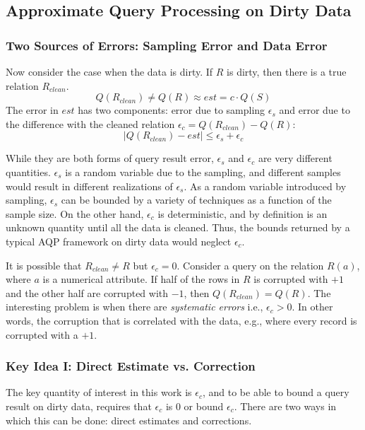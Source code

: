 \subsection{Approximate Query Processing on Dirty Data}


\subsubsection{Two Sources of Errors: Sampling Error and Data Error}
Now consider the case when the data is dirty.
If $R$ is dirty, then there is a true relation $R_{clean}$.
\[
Q(R_{clean}) \ne Q(R) \approx est = c \cdot Q(S)
\]
The error in $est$ has two components: error due to sampling $\epsilon_s$ and error due to the difference with the cleaned relation $\epsilon_c = Q(R_{clean}) - Q(R)$:
\[
\mid Q(R_{clean}) - est \mid \le \epsilon_s + \epsilon_c
\]

While they are both forms of query result error, $\epsilon_s$ and $\epsilon_c$ are very different quantities.
$\epsilon_s$ is a random variable due to the sampling, and different samples would result in different realizations of $\epsilon_s$.
As a random variable introduced by sampling, $\epsilon_s$ can be bounded by a variety of techniques as a function of the sample size.
On the other hand, $\epsilon_c$ is deterministic, and by definition is an unknown quantity until all the data is cleaned.
Thus, the bounds returned by a typical AQP framework on dirty data would neglect $\epsilon_c$.

It is possible that $R_{clean} \ne R$ but $\epsilon_c=0$.
Consider a \sumfunc query on the relation $R(a)$, where $a$ is a numerical attribute.
If half of the rows in $R$ is corrupted with $+1$ and the other half are corrupted with $-1$, then $Q(R_{clean}) = Q(R)$.
The interesting problem is when there are \emph{systematic errors}\cite{taylor1982introduction} i.e., $\epsilon_c > 0$. 
In other words, the corruption that is correlated with the data, e.g., where every record is corrupted with a $+1$.

\subsubsection{Key Idea I: Direct Estimate vs. Correction}
The key quantity of interest in this work is $\epsilon_c$, and to be able to bound
a query result on dirty data, requires that $\epsilon_c$ is 0 or bound $\epsilon_c$.
There are two ways in which this can be done: direct estimates and corrections.

